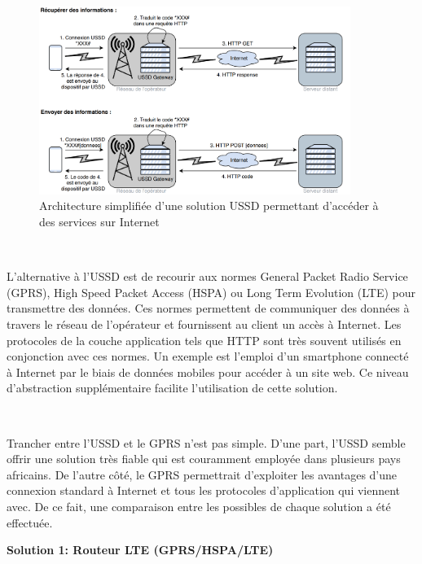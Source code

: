 \begin{figure}[ht!]
  \centering
  \includegraphics[width=0.90\textwidth]{img/el_prototype/ussd_examples.png}
  \caption{Architecture simplifiée d'une solution USSD permettant d'accéder à des services sur Internet}
  \label{fig:ussdex}
\end{figure}

~

\noindent
L'alternative à l'USSD est de recourir aux normes General Packet Radio Service (GPRS), High Speed Packet Access (HSPA) ou Long Term Evolution (LTE) pour transmettre des données. Ces normes permettent de communiquer des données à travers le réseau de l'opérateur et fournissent au client un accès à Internet. Les protocoles de la couche application tels que HTTP sont très souvent utilisés en conjonction avec ces normes. Un exemple est l'emploi d'un smartphone connecté à Internet par le biais de données mobiles pour accéder à un site web. Ce niveau d'abstraction supplémentaire facilite l'utilisation de cette solution.

~

\noindent
Trancher entre l'USSD et le GPRS n'est pas simple. D'une part, l'USSD semble offrir une solution très fiable qui est couramment employée dans plusieurs pays africains. De l'autre côté, le GPRS permettrait d'exploiter les avantages d'une connexion standard à Internet et tous les protocoles d'application qui viennent avec. De ce fait, une comparaison entre les possibles de chaque solution a été effectuée.


\newpage

\textbf{Solution 1: Routeur LTE (GPRS/HSPA/LTE)}

\vspace{-0.2cm}
~

